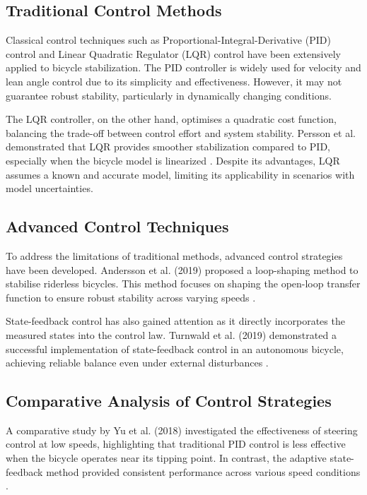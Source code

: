 \subsection{Traditional Control Methods}
Classical control techniques such as Proportional-Integral-Derivative (PID) control and  Linear Quadratic Regulator (LQR) control have been extensively applied to bicycle stabilization. The PID controller is widely used for velocity and lean angle control due to its simplicity and effectiveness. However, it may not guarantee robust stability, particularly in dynamically changing conditions.

The LQR controller, on the other hand, optimises a quadratic cost function, balancing the trade-off between control effort and system stability. Persson et al. demonstrated that LQR provides smoother stabilization compared to PID, especially when the bicycle model is linearized \cite{persson2021comparative}. Despite its advantages, LQR assumes a known and accurate model, limiting its applicability in scenarios with model uncertainties.

\subsection{Advanced Control Techniques}
To address the limitations of traditional methods, advanced control strategies have been developed. Andersson et al. (2019) proposed a loop-shaping method to stabilise riderless bicycles. This method focuses on shaping the open-loop transfer function to ensure robust stability across varying speeds \cite{andersson2019}.

State-feedback control has also gained attention as it directly incorporates the measured states into the control law. Turnwald et al. (2019) demonstrated a successful implementation of state-feedback control in an autonomous bicycle, achieving reliable balance even under external disturbances \cite{turnwald2019}.

\subsection{Comparative Analysis of Control Strategies}
A comparative study by Yu et al. (2018) investigated the effectiveness of steering control at low speeds, highlighting that traditional PID control is less effective when the bicycle operates near its tipping point. In contrast, the adaptive state-feedback method provided consistent performance across various speed conditions \cite{yu2018}.

